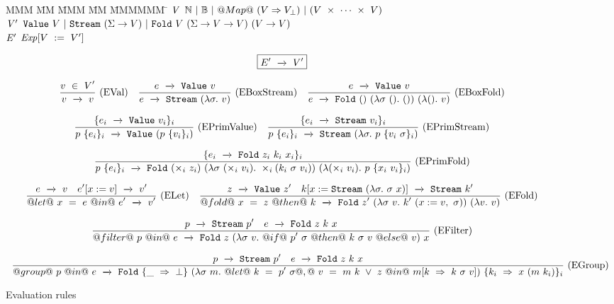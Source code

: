 
\begin{figure*}

\begin{tabbing}
MMM \= MM \= MMM \= MM \= MMMMMM \= \kill
$\mathit{V}$
\GrammarDef
  $\mathbb{N}~|~\mathbb{B}~|~@Map@~(V \Rightarrow V_\bot)~|~(V~\times~\cdots~\times~V)$
\\
$\mathit{V'}$
\GrammarDef
  $\texttt{Value}~V~|~\texttt{Stream}~(\Sigma \to V)~|~\texttt{Fold}~V~(\Sigma \to V \to V)~(V \to V)$
\\
$\mathit{E'}$
\GrammarDef
  $\mathit{Exp}[V~:=~V']$
\\
\end{tabbing}

$$
\boxed{E' ~\xrightarrow~~ V'}
$$

$$
\enskip \frac {\displaystyle 
    v~\in~V'
} {\displaystyle 
    v ~\xrightarrow~~ v
} \  \mbox{(EVal)} \enskip
\enskip \frac {\displaystyle 
    e ~\xrightarrow~~ \texttt{Value}~v
} {\displaystyle 
    e ~\xrightarrow~~ \texttt{Stream}~(\lambda{}\sigma.~ v)
} \  \mbox{(EBoxStream)} \enskip
\enskip \frac {\displaystyle 
    e ~\xrightarrow~~ \texttt{Value}~v
} {\displaystyle 
    e ~\xrightarrow~~ \texttt{Fold}~()~(\lambda{}\sigma~().~ ())~(\lambda{}().~ v)
} \  \mbox{(EBoxFold)} \enskip
$$

$$
\enskip \frac {\displaystyle 
  \{ e_i ~\xrightarrow~~ \texttt{Value}~v_i \}_i
} {\displaystyle 
  p~\{ e_i \}_i  ~\xrightarrow~~ \texttt{Value}~(p~\{v_i\}_i)
} \  \mbox{(EPrimValue)} \enskip
\enskip \frac {\displaystyle 
  \{ e_i ~\xrightarrow~~ \texttt{Stream}~v_i \}_i
} {\displaystyle 
  p~\{ e_i \}_i  ~\xrightarrow~~ \texttt{Stream}~(\lambda{}\sigma.~ p~\{v_i~\sigma\}_i)
} \  \mbox{(EPrimStream)} \enskip
$$

$$
\enskip \frac {\displaystyle 
  \{ e_i ~\xrightarrow~~ \texttt{Fold}~z_i~k_i~x_i \}_i
} {\displaystyle 
  p~\{ e_i \}_i  ~\xrightarrow~~ \texttt{Fold}~(\times_i~z_i)~(\lambda{}\sigma~(\times_i~v_i).~
        \times_i (k_i~\sigma~v_i))~(\lambda{}(\times_i~v_i).~
        p~\{x_i~v_i\}_i)
} \  \mbox{(EPrimFold)} \enskip
$$

$$
\enskip \frac {\displaystyle 
  e ~\xrightarrow~~ v
  \quad
  e'[x:=v] ~\xrightarrow~~ v'
} {\displaystyle 
  @let@~x~=~e~@in@~e' ~\xrightarrow~~ v'
} \  \mbox{(ELet)} \enskip
\enskip \frac {\displaystyle 
  z ~\xrightarrow~~ \texttt{Value}~z'
  \quad
  k[x:=\texttt{Stream}~(\lambda{}\sigma.~ \sigma~x)] ~\xrightarrow~~ \texttt{Stream}~k'
} {\displaystyle 
  @fold@~x~=~z~@then@~k ~\xrightarrow~~ \texttt{Fold}~z'~(\lambda{}\sigma~v.~ k'~(x:=v,~\sigma))~(\lambda{}v.~ v)
} \  \mbox{(EFold)} \enskip
$$

$$
\enskip \frac {\displaystyle 
  p ~\xrightarrow~~ \texttt{Stream}~p'
  \quad
  e ~\xrightarrow~~ \texttt{Fold}~z~k~x
} {\displaystyle 
  @filter@~p~@in@~e ~\xrightarrow~~ \texttt{Fold}~z~(\lambda{}\sigma~v.~
         @if@~p'~\sigma~@then@~k~\sigma~v~@else@~v)~x
} \  \mbox{(EFilter)} \enskip
$$

$$
\ruleIN
{
  \SourceStepX{p}{\VStream{p'}}
  \quad
  \SourceStepX{e}{\VFold{z}{k}{x}}
}
{
  \SourceStepX
    {@group@~p~@in@~e}
    {\VFold
      {\{\_~\Rightarrow~\bot\}}
      {(\lam{\sigma~m}
        @let@~k~=~p'~\sigma@,@~
              v~=~m~k~\vee~z
        ~@in@~
          m[k~\Rightarrow~k~\sigma~v])}
      {\{k_i~\Rightarrow~x~(m~k_i)\}_i}}
}{EGroup}
$$


\caption{Evaluation rules}
\label{fig:source:eval}
\end{figure*}


